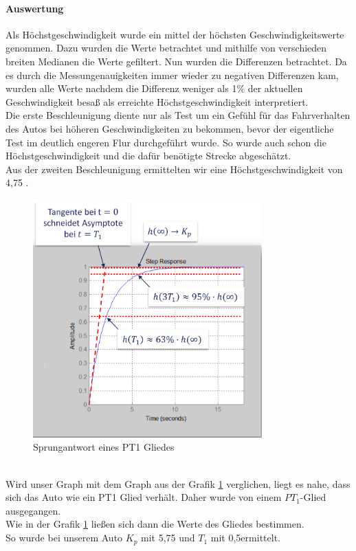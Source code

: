 \documentclass[a4paper,12pt]{report}
\begin{document}
	\paragraph{Auswertung}
	Als Höchstgeschwindigkeit wurde ein mittel der höchsten Geschwindigkeitswerte genommen. Dazu wurden die Werte betrachtet und mithilfe von verschieden breiten Medianen die Werte gefiltert. Nun wurden die Differenzen betrachtet. Da es durch die Messungenauigkeiten immer wieder zu negativen Differenzen kam, wurden alle Werte nachdem die Differenz weniger als 1\% der aktuellen Geschwindigkeit besaß als erreichte Höchstgeschwindigkeit interpretiert. \\
	Die erste Beschleunigung diente nur als Test um ein Gefühl für das Fahrverhalten des Autos bei höheren Geschwindigkeiten zu bekommen, bevor der eigentliche Test im deutlich engeren Flur durchgeführt wurde. So wurde auch schon die Höchstgeschwindigkeit und die dafür benötigte Strecke abgeschätzt.\\
	Aus der zweiten Beschleunigung ermittelten wir eine Höchstgeschwindigkeit von 4,75 \meter\per\second.\\
	\begin{figure}[ht]
		\centering
		\includegraphics[width=250pt,keepaspectratio]{assets/PT1-Sprungantwort.PNG}
		\caption{Sprungantwort eines PT1 Gliedes}
		\label{img-PT1-Sprungantwort}
	\end{figure}\\
	Wird unser Graph mit dem Graph aus der Grafik \ref{img-PT1-Sprungantwort} verglichen, liegt es nahe, dass sich das Auto wie ein PT1 Glied verhält. Daher wurde von einem $PT_1$-Glied ausgegangen. \\ 
	Wie in der Grafik \ref{img-PT1-Sprungantwort} ließen sich dann die Werte des Gliedes bestimmen.\\
	So wurde bei unserem Auto $K_p$ mit 5,75 \meter\per\second\usk und $T_1$ mit 0,5\second\usk ermittelt.\\
	
\end{document}
